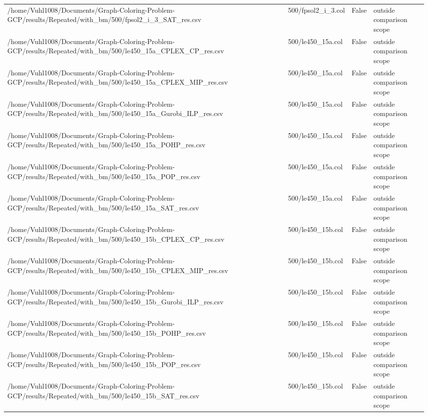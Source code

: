 \begin{table}[htbp]
\begin{tabular}{llll}
/home/Vuhl1008/Documents/Graph-Coloring-Problem-GCP/results/Repeated/with\_bm/500/fpsol2\_i\_3\_SAT\_res.csv & 500/fpsol2\_i\_3.col & False & outside comparison scope \\
/home/Vuhl1008/Documents/Graph-Coloring-Problem-GCP/results/Repeated/with\_bm/500/le450\_15a\_CPLEX\_CP\_res.csv & 500/le450\_15a.col & False & outside comparison scope \\
/home/Vuhl1008/Documents/Graph-Coloring-Problem-GCP/results/Repeated/with\_bm/500/le450\_15a\_CPLEX\_MIP\_res.csv & 500/le450\_15a.col & False & outside comparison scope \\
/home/Vuhl1008/Documents/Graph-Coloring-Problem-GCP/results/Repeated/with\_bm/500/le450\_15a\_Gurobi\_ILP\_res.csv & 500/le450\_15a.col & False & outside comparison scope \\
/home/Vuhl1008/Documents/Graph-Coloring-Problem-GCP/results/Repeated/with\_bm/500/le450\_15a\_POHP\_res.csv & 500/le450\_15a.col & False & outside comparison scope \\
/home/Vuhl1008/Documents/Graph-Coloring-Problem-GCP/results/Repeated/with\_bm/500/le450\_15a\_POP\_res.csv & 500/le450\_15a.col & False & outside comparison scope \\
/home/Vuhl1008/Documents/Graph-Coloring-Problem-GCP/results/Repeated/with\_bm/500/le450\_15a\_SAT\_res.csv & 500/le450\_15a.col & False & outside comparison scope \\
/home/Vuhl1008/Documents/Graph-Coloring-Problem-GCP/results/Repeated/with\_bm/500/le450\_15b\_CPLEX\_CP\_res.csv & 500/le450\_15b.col & False & outside comparison scope \\
/home/Vuhl1008/Documents/Graph-Coloring-Problem-GCP/results/Repeated/with\_bm/500/le450\_15b\_CPLEX\_MIP\_res.csv & 500/le450\_15b.col & False & outside comparison scope \\
/home/Vuhl1008/Documents/Graph-Coloring-Problem-GCP/results/Repeated/with\_bm/500/le450\_15b\_Gurobi\_ILP\_res.csv & 500/le450\_15b.col & False & outside comparison scope \\
/home/Vuhl1008/Documents/Graph-Coloring-Problem-GCP/results/Repeated/with\_bm/500/le450\_15b\_POHP\_res.csv & 500/le450\_15b.col & False & outside comparison scope \\
/home/Vuhl1008/Documents/Graph-Coloring-Problem-GCP/results/Repeated/with\_bm/500/le450\_15b\_POP\_res.csv & 500/le450\_15b.col & False & outside comparison scope \\
/home/Vuhl1008/Documents/Graph-Coloring-Problem-GCP/results/Repeated/with\_bm/500/le450\_15b\_SAT\_res.csv & 500/le450\_15b.col & False & outside comparison scope \\

\end{tabular}
\end{table}
